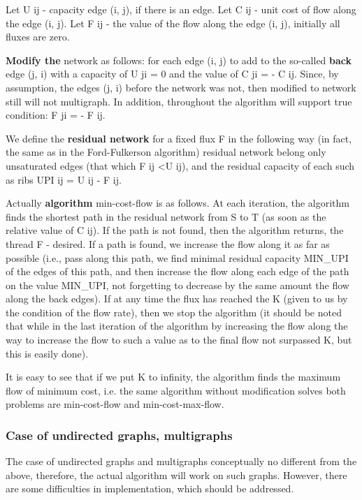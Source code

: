 Let U ij - capacity edge (i, j), if there is an edge. Let C ij - unit cost of flow along the edge (i, j). Let F ij - the value of the flow along the edge (i, j), initially all fluxes are zero.

\textbf{Modify the} network as follows: for each edge (i, j) to add to the so-called \textbf{back} edge (j, i) with a capacity of U ji = 0 and the value of C ji = - C ij. Since, by assumption, the edges (j, i) before the network was not, then modified to network still will not multigraph. In addition, throughout the algorithm will support true condition: F ji = - F ij.

We define the \textbf{residual network} for a fixed flux F in the following way (in fact, the same as in the Ford-Fulkerson algorithm) residual network belong only unsaturated edges (that which F ij <U ij), and the residual capacity of each such as ribs UPI ij = U ij - F ij.

Actually \textbf{algorithm} min-cost-flow is as follows. At each iteration, the algorithm finds the shortest path in the residual network from S to T (as soon as the relative value of C ij). If the path is not found, then the algorithm returns, the thread F - desired. If a path is found, we increase the flow along it as far as possible (i.e., pass along this path, we find minimal residual capacity MIN\_UPI of the edges of this path, and then increase the flow along each edge of the path on the value MIN\_UPI, not forgetting to decrease by the same amount the flow along the back edges). If at any time the flux has reached the K (given to us by the condition of the flow rate), then we stop the algorithm (it should be noted that while in the last iteration of the algorithm by increasing the flow along the way to increase the flow to such a value as to the final flow not surpassed K, but this is easily done).

It is easy to see that if we put K to infinity, the algorithm finds the maximum flow of minimum cost, i.e. the same algorithm without modification solves both problems are min-cost-flow and min-cost-max-flow.

\subsubsection{ Case of undirected graphs, multigraphs }
The case of undirected graphs and multigraphs conceptually no different from the above, therefore, the actual algorithm will work on such graphs. However, there are some difficulties in implementation, which should be addressed.

